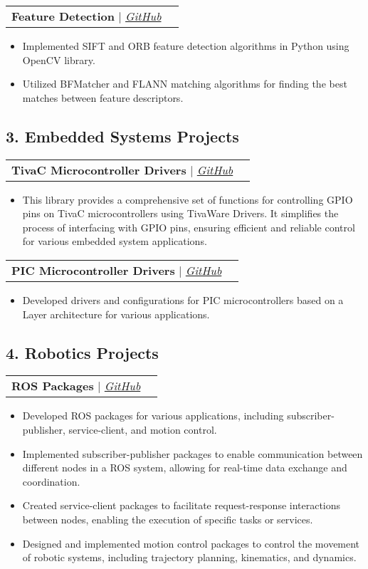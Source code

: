\documentclass[letterpaper,11pt]{article}
\makeatletter
\newcommand{\resumeItem}[1]{
  \item\small{
    {#1 \vspace{-2pt}}
  }
}
\newcommand{\resumeProjectHeading}[2]{
    \vspace{-2pt}\item
    \begin{tabular*}{0.97\textwidth}{l@{\extracolsep{\fill}}r}
      \small#1 & #2 \\
    \end{tabular*}\vspace{-7pt}
}
\newcommand{\resumeItemListStart}{\begin{itemize}}
\newcommand{\resumeItemListEnd}{\end{itemize}\vspace{-5pt}}
\makeatother
\begin{document}
    \resumeProjectHeading
    {\textbf{Feature Detection} $|$ \emph{\href{https://github.com/your-username/sift-orb-feature-detection}{\color{blue}GitHub}}}{}
    \resumeItemListStart
      \resumeItem{Implemented SIFT and ORB feature detection algorithms in Python using OpenCV library.}
      \resumeItem{Utilized BFMatcher and FLANN matching algorithms for finding the best matches between feature descriptors.}
      \resumeItemListEnd
    
  \subsection*{3. Embedded Systems Projects}
   \vspace{1pt}
  \resumeProjectHeading
  {\textbf{TivaC Microcontroller Drivers} $|$ \emph{\href{https://github.com/HtmMhmd/TivaC-microcontroller-drivers}{\color{blue}GitHub}}}{}
    \resumeItemListStart
      \resumeItem{This library provides a comprehensive set of functions for controlling GPIO pins on TivaC microcontrollers using TivaWare Drivers. It simplifies the process of interfacing with GPIO pins, ensuring efficient and reliable control for various embedded system applications.}
    \resumeItemListEnd

    \resumeProjectHeading
    {\textbf{PIC Microcontroller Drivers} $|$ \emph{\href{https://github.com/HtmMhmd/TivaC-microcontroller-drivers}{\color{blue}GitHub}}}{}
    \resumeItemListStart
      \resumeItem{Developed drivers and configurations for PIC microcontrollers based on a Layer architecture for various applications.}
    \resumeItemListEnd


    \subsection*{4. Robotics Projects}
     \vspace{1pt}
    \resumeProjectHeading
    {\textbf{ROS Packages} $|$ \emph{\href{https://github.com/HtmMhmd/ROS_packages}{\color{blue}GitHub}}}{}
      \resumeItemListStart
          \resumeItem{Developed ROS packages for various applications, including subscriber-publisher, service-client, and motion control.}
          \resumeItem{Implemented subscriber-publisher packages to enable communication between different nodes in a ROS system, allowing for real-time data exchange and coordination.}
          \resumeItem{Created service-client packages to facilitate request-response interactions between nodes, enabling the execution of specific tasks or services.}
          \resumeItem{Designed and implemented motion control packages to control the movement of robotic systems, including trajectory planning, kinematics, and dynamics.}
      \resumeItemListEnd
\end{document}
